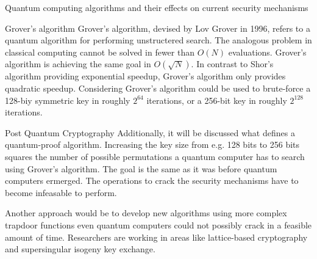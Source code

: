 \documentclass[aps,twocolumn,preprintnumbers]{revtex4}
\begin{document}
\begin{section}{Quantum computing algorithms and their effects on current security mechanisms}
\begin{subsection}{Grover's algorithm}
Grover's algorithm, devised by Lov Grover in 1996,
refers to a quantum algorithm for performing unstructered search. 
The analogous problem in classical computing cannot be solved in fewer than $O(N)$ evaluations. 
Grover's algorithm is achieving the same goal in $O(\sqrt{N})$. 
In contrast to Shor's algorithm providing exponential speedup, 
Grover's algorithm only provides quadratic speedup. 
Considering Grover's algorithm could be used to brute-force a 128-biy symmetric key in roughly $2^{64}$ iterations, 
or a 256-bit key in roughly $2^{128}$ iterations.
\end{subsection}

\end{section}

\begin{section}{Post Quantum Cryptography}
Additionally, it will be discussed what defines a quantum-proof algorithm. 
Increasing the key size from e.g. 128 bits to 256 bits squares the number of possible permutations a quantum computer has to search using Grover's algorithm.
The goal is the same as it was before quantum computers ermerged.
The operations to crack the security mechanisms have to become infeasable to perform. 

Another approach would be to develop new algorithms using more complex trapdoor functions even quantum computers could not possibly crack in a feasible amount of time. 
Researchers are working in areas like lattice-based cryptography and supersingular isogeny key exchange.
\end{section}
\end{document}
